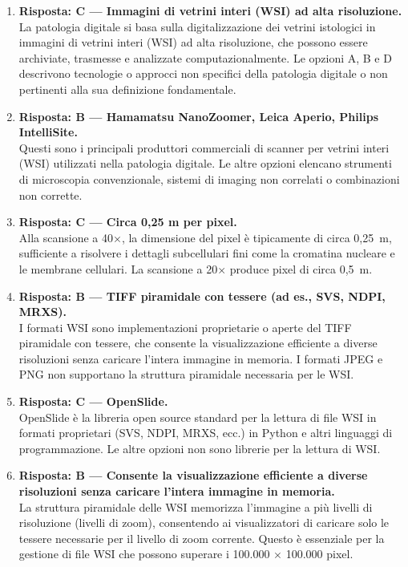 \begin{enumerate}

    \item \textbf{Risposta: C --- Immagini di vetrini interi (WSI) ad alta risoluzione.}\\
    La patologia digitale si basa sulla digitalizzazione dei vetrini istologici in immagini di
    vetrini interi (WSI) ad alta risoluzione, che possono essere archiviate, trasmesse e
    analizzate computazionalmente. Le opzioni A, B e D descrivono tecnologie o approcci non
    specifici della patologia digitale o non pertinenti alla sua definizione fondamentale.

    \item \textbf{Risposta: B --- Hamamatsu NanoZoomer, Leica Aperio, Philips IntelliSite.}\\
    Questi sono i principali produttori commerciali di scanner per vetrini interi (WSI) utilizzati
    nella patologia digitale. Le altre opzioni elencano strumenti di microscopia convenzionale,
    sistemi di imaging non correlati o combinazioni non corrette.

    \item \textbf{Risposta: C --- Circa 0,25 \textmu m per pixel.}\\
    Alla scansione a 40$\times$, la dimensione del pixel è tipicamente di circa 0,25~\textmu m,
    sufficiente a risolvere i dettagli subcellulari fini come la cromatina nucleare e le membrane
    cellulari. La scansione a 20$\times$ produce pixel di circa 0,5~\textmu m.

    \item \textbf{Risposta: B --- TIFF piramidale con tessere (ad es., SVS, NDPI, MRXS).}\\
    I formati WSI sono implementazioni proprietarie o aperte del TIFF piramidale con tessere, che
    consente la visualizzazione efficiente a diverse risoluzioni senza caricare l'intera immagine
    in memoria. I formati JPEG e PNG non supportano la struttura piramidale necessaria per le WSI.

    \item \textbf{Risposta: C --- OpenSlide.}\\
    OpenSlide è la libreria open source standard per la lettura di file WSI in formati proprietari
    (SVS, NDPI, MRXS, ecc.) in Python e altri linguaggi di programmazione. Le altre opzioni non
    sono librerie per la lettura di WSI.

    \item \textbf{Risposta: B --- Consente la visualizzazione efficiente a diverse risoluzioni
    senza caricare l'intera immagine in memoria.}\\
    La struttura piramidale delle WSI memorizza l'immagine a più livelli di risoluzione (livelli
    di zoom), consentendo ai visualizzatori di caricare solo le tessere necessarie per il livello
    di zoom corrente. Questo è essenziale per la gestione di file WSI che possono superare i
    100.000 $\times$ 100.000 pixel.


\end{enumerate}
